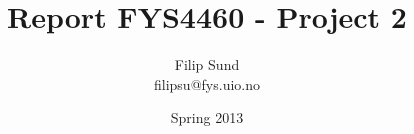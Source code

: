 \documentclass[a4paper,10pt]{article}
\title{Report FYS4460 - Project 2}
\author{Filip Sund \\ filipsu@fys.uio.no}
\date{Spring 2013}
\begin{document}
\maketitle{}


% 
%
\end{document}
